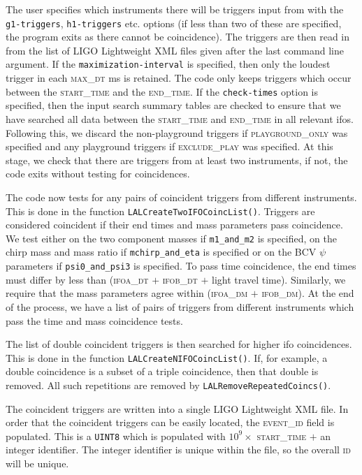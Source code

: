 \begin{entry}
The user specifies which instruments there will be triggers input from with
the \texttt{g1-triggers}, \texttt{h1-triggers} etc. options (if less than two
of these are specified, the program exits as there cannot be coincidence).
The triggers are then read in from the list of LIGO Lightweight XML files
given after the last command line argument.  If the
\texttt{maximization-interval} is specified, then only the loudest trigger in
each \textsc{max\_dt} ms is retained. The code only keeps triggers which occur
between the \textsc{start\_time} and the \textsc{end\_time}.  If the
\texttt{check-times} option is specified, then the input search summary tables
are checked to ensure that we have searched all data between the
\textsc{start\_time} and \textsc{end\_time} in all relevant ifos.  Following
this, we discard the non-playground triggers if \textsc{playground\_only} was
specified and any playground triggers if \textsc{exclude\_play} was specified.
At this stage, we check that there are triggers from at least two instruments,
if not, the code exits without testing for coincidences. 

The code now tests for any pairs of coincident triggers from different
instruments.  This is done in the function
\texttt{LALCreateTwoIFOCoincList()}.  Triggers are considered coincident if
their end times and mass parameters pass coincidence.  We test either on the
two component masses if \texttt{m1\_and\_m2} is specified, on the chirp mass
and mass ratio if \texttt{mchirp\_and\_eta} is specified or on the BCV $\psi$
parameters if \texttt{psi0\_and\_psi3} is specified.  To pass time
coincidence, the end times must differ by less than (\textsc{ifoa\_dt} $+$
\textsc{ifob\_dt} $+$ light travel time).  Similarly, we require that the mass
parameters agree within (\textsc{ifoa\_dm} $+$ \textsc{ifob\_dm}).  At the end
of the process, we have a list of pairs of triggers from different instruments
which pass the time and mass coincidence tests. 

The list of double coincident triggers is then searched for higher ifo
coincidences.  This is done in the function \texttt{LALCreateNIFOCoincList()}.
If, for example, a double coincidence is a subset of a triple coincidence,
then that double is removed.  All such repetitions are removed by
\texttt{LALRemoveRepeatedCoincs()}.

The coincident triggers are written into a single LIGO Lightweight XML file.
In order that the coincident triggers can be easily located, the
\textsc{event\_id} field is populated.  This is a \texttt{UINT8} which is
populated with $10^{9} \times$ \textsc{start\_time} $+$ an integer identifier.
The integer identifier is unique within the file, so the overall \textsc{id}
will be unique.  


\end{entry}
